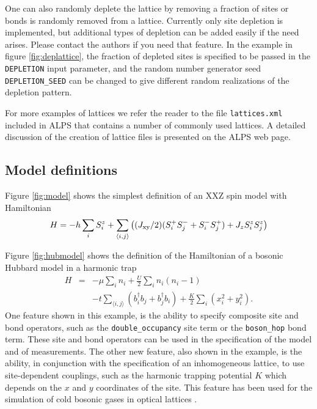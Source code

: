 \documentclass[12pt]{iopart}
\begin{document}
One can also randomly deplete the lattice by removing a fraction of sites or bonds is randomly removed from a lattice. Currently only site depletion is implemented, but additional types of depletion can be added easily if  the need arises. Please contact the authors if you need that feature. In the example in figure  \ref{fig:deplattice}, the fraction of depleted sites is specified to be passed in the {\tt DEPLETION} input parameter, and the random number generator seed {\tt DEPLETION\_SEED} can be changed to give different random realizations of the depletion pattern.

For more examples of lattices we refer the reader to the file {\tt lattices.xml} included in ALPS that contains a number of commonly used lattices. A detailed discussion of the creation of lattice files is presented on the ALPS web page.


\subsection{Model definitions}

Figure \ref{fig:model} shows the simplest definition of an XXZ spin model with Hamiltonian
\begin{equation}
H=-h\sum_iS_i^z+\sum_{\langle i,j\rangle} \left((J_{\rm xy}/2)(S_i^+S_j^-+S_i^-S_j^+)+J_zS_i^zS_j^z\right)
\end{equation}

Figure \ref{fig:hubmodel} shows the definition of the Hamiltonian of a bosonic Hubbard model in a harmonic trap
 \begin{eqnarray}
 H&=&-\mu\sum_in_i+\frac{U}{2}\sum_in_i(n_i-1)   \label{eq:model} \\
    && -t \sum_{\langle
    i,j\rangle} \left(b_i^\dag b_j + b_j^\dag b_i\right) + \frac{K}{2}\sum_i(x_i^2+y_i^2). \nonumber
  \end{eqnarray}
One feature shown in this example, is the ability to specify composite site and bond operators, such as the {\tt double\_occupancy} site term or the {\tt boson\_hop} bond term. These site and bond operators can be used in the specification of the model and of measurements.
  The other new feature, also shown in the example, is the ability, in conjunction with the specification of an inhomogeneous lattice,  to use site-dependent couplings, such as the harmonic trapping potential $K$ which depends on the $x$ and $y$ coordinates of the site. This feature has been used for the simulation of cold bosonic gases in optical lattices \cite{Wessel2004}.
\end{document}
